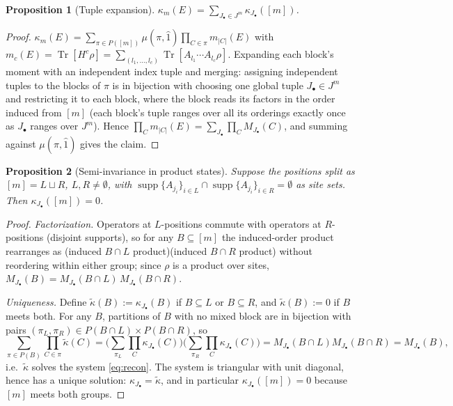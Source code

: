 \documentclass[11pt]{article}
\newtheorem{proposition}{Proposition}
\theoremstyle{remark}
\newcommand{\Tr}{\operatorname{Tr}}
\newcommand{\supp}{\operatorname{supp}}
\begin{document}
\begin{proposition}[Tuple expansion]\label{prop:tuple}
$\displaystyle \kappa_m(E)=\sum_{J_\bullet\in J^m}\kappa_{J_\bullet}([m])$.
\end{proposition}

\begin{proof}
$\kappa_m(E)=\sum_{\pi\in P([m])}\mu(\pi,\hat1)\prod_{C\in\pi}m_{|C|}(E)$
with $m_c(E)=\Tr[H^c\rho]=\sum_{(l_1,\dots,l_c)}
\Tr[A_{l_1}\!\cdots A_{l_c}\rho]$. Expanding each block's moment with an
independent index tuple and merging: assigning independent tuples to the
blocks of $\pi$ is in bijection with choosing one global tuple
$J_\bullet\in J^m$ and restricting it to each block, where the block reads
its factors in the order induced from $[m]$ (each block's tuple ranges over
all its orderings exactly once as $J_\bullet$ ranges over $J^m$). Hence
$\prod_{C}m_{|C|}(E)=\sum_{J_\bullet}\prod_C M_{J_\bullet}(C)$, and summing
against $\mu(\pi,\hat1)$ gives the claim.
\end{proof}

\begin{proposition}[Semi-invariance in product states]\label{prop:semi}
Suppose the positions split as $[m]=L\sqcup R$, $L,R\ne\emptyset$, with
$\supp\{A_{j_i}\}_{i\in L}\cap\supp\{A_{j_i}\}_{i\in R}=\emptyset$ as site
sets. Then $\kappa_{J_\bullet}([m])=0$.
\end{proposition}

\begin{proof}
\emph{Factorization.} Operators at $L$-positions commute with operators at
$R$-positions (disjoint supports), so for any $B\subseteq[m]$ the
induced-order product rearranges as (induced $B\cap L$ product)(induced
$B\cap R$ product) without reordering within either group; since $\rho$ is a
product over sites,
$M_{J_\bullet}(B)=M_{J_\bullet}(B\cap L)\,M_{J_\bullet}(B\cap R)$.

\emph{Uniqueness.} Define
$\tilde\kappa(B):=\kappa_{J_\bullet}(B)$ if $B\subseteq L$ or
$B\subseteq R$, and $\tilde\kappa(B):=0$ if $B$ meets both. For any $B$,
partitions of $B$ with no mixed block are in bijection with pairs
$(\pi_L,\pi_R)\in P(B\cap L)\times P(B\cap R)$, so
\[
\sum_{\pi\in P(B)}\prod_{C\in\pi}\tilde\kappa(C)
=\Big(\sum_{\pi_L}\prod_{C}\kappa_{J_\bullet}(C)\Big)
\Big(\sum_{\pi_R}\prod_{C}\kappa_{J_\bullet}(C)\Big)
=M_{J_\bullet}(B\cap L)M_{J_\bullet}(B\cap R)=M_{J_\bullet}(B),
\]
i.e.\ $\tilde\kappa$ solves the system \eqref{eq:recon}. The system is
triangular with unit diagonal, hence has a unique solution:
$\kappa_{J_\bullet}=\tilde\kappa$, and in particular
$\kappa_{J_\bullet}([m])=0$ because $[m]$ meets both groups.
\end{proof}
\end{document}
